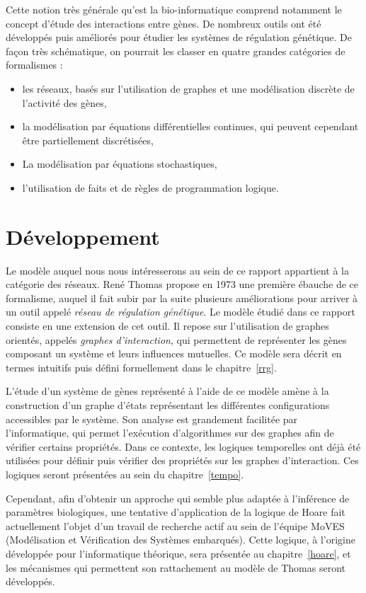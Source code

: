 \documentclass[fleqn,11pt]{report}
\begin{document}
Cette notion très générale qu'est la bio-informatique comprend notamment le concept d'étude des interactions entre gènes. De nombreux outils ont été développés puis améliorés pour étudier les systèmes de régulation génétique. De façon très schématique, on pourrait les classer en quatre grandes catégories de formalismes \cite{jong-02} :
\begin{itemize}
  \item les réseaux, basés sur l'utilisation de graphes et une modélisation discrète de l'activité des gènes,
  \item la modélisation par équations différentielles continues, qui peuvent cependant être partiellement discrétisées,
  \item La modélisation par équations stochastiques,
  \item l'utilisation de faits et de règles de programmation logique.
\end{itemize}

\section*{Développement}
Le modèle auquel nous nous intéresserons au sein de ce rapport appartient à la catégorie des réseaux. René Thomas propose en 1973 une première ébauche de ce formalisme, auquel il fait subir par la suite plusieurs améliorations pour arriver à un outil appelé \emph{réseau de régulation génétique}. Le modèle étudié dans ce rapport consiste en une extension de cet outil. Il repose sur l'utilisation de graphes orientés, appelés \emph{graphes d'interaction}, qui permettent de représenter les gènes composant un système et leurs influences mutuelles. Ce modèle sera décrit en termes intuitifs puis défini formellement dans le chapitre~\ref{rrg}.

L'étude d'un système de gènes représenté à l'aide de ce modèle amène à la construction d'un graphe d'états représentant les différentes configurations accessibles par le système. Son analyse est grandement facilitée par l'informatique, qui permet l'exécution d'algorithmes sur des graphes afin de vérifier certains propriétés. Dans ce contexte, les logiques temporelles ont déjà été utilisées pour définir puis vérifier des propriétés sur les graphes d'interaction. Ces logiques seront présentées au sein du chapitre~\ref{tempo}.

Cependant, afin d'obtenir un approche qui semble plus adaptée à l'inférence de paramètres biologiques, une tentative d'application de la logique de Hoare fait actuellement l'objet d'un travail de recherche actif au sein de l'équipe MoVES (Modélisation et Vérification des Systèmes embarqués). Cette logique, à l'origine développée pour l'informatique théorique, sera présentée au chapitre~\ref{hoare}, et les mécanismes qui permettent son rattachement au modèle de Thomas seront développés.
\end{document}
